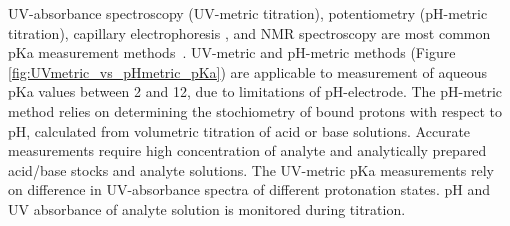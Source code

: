 \documentclass[9pt,lineno]{elife}
\begin{document}
\begin{figure}
\begin{center}
{}
\label{fig:micro_vs_macro_pKa}
\end{center}
\end{figure}

UV-absorbance spectroscopy (UV-metric titration), potentiometry (pH-metric titration), capillary electrophoresis , and NMR spectroscopy are most common pKa measurement methods~\citep{comer_ionization_2014}. UV-metric and pH-metric methods (Figure \ref{fig:UVmetric_vs_pHmetric_pKa}) are applicable to measurement of aqueous pKa values between 2 and 12, due to limitations of pH-electrode. The pH-metric method relies on determining the stochiometry of bound protons with respect to pH, calculated from volumetric titration of acid or base solutions. Accurate measurements require high concentration of analyte and analytically prepared acid/base stocks and analyte solutions. The UV-metric pKa measurements rely on difference in UV-absorbance spectra of different protonation states. pH and UV absorbance of analyte solution is monitored during titration. 
\end{document}
